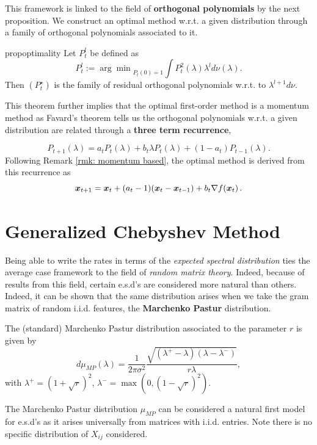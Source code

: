 \documentclass{article}
\begin{document}
This framework is  linked to the field of \textbf{orthogonal polynomials} by the next proposition. We construct an optimal method w.r.t. a given distribution through a family  of orthogonal polynomials associated to it.


\begin{restatable}{prop}{optimality}\citep{pedregosa2020acceleration}
 \label{prop: optimality}
 Let $P_t^l$ be defined as
 \begin{equation}
     P_t^l:={\arg \min}_{P_t(0)=1} \int P_t^2(\lambda) \lambda^l d\nu(\lambda).
 \end{equation}
 Then $(P_t^\star)$ is the family of residual orthogonal polynomials w.r.t. to $\lambda^{l+1}d\nu$.
\end{restatable}

This theorem further implies that the optimal first-order method is a momentum method as Favard's theorem \cite{marcellan2001favard} tells us the orthogonal polynomials w.r.t. a given distribution are related through a \textbf{three term recurrence},

\begin{equation}
    P_{t+1}(\lambda)=a_tP_t(\lambda)+b_t\lambda P_t(\lambda)+(1-a_t)P_{t-1}(\lambda).
\end{equation}
Following Remark \ref{rmk: momentum based}, the optimal method is derived from this recurrence as
\begin{equation}
    {\boldsymbol x}_{t+1}={\boldsymbol x}_t+(a_t-1)({\boldsymbol x}_t-{\boldsymbol x}_{t-1})+b_t\nabla f({\boldsymbol x}_t)\,.
\end{equation}



\section{Generalized Chebyshev Method} \label{section: methods}
Being able to write the rates in terms of the \textit{expected spectral distribution} ties the average case framework to the field of \textit{random matrix theory}. Indeed, because of results from this field, certain e.s.d's are considered more natural than others. Indeed, it can be shown that the same distribution arises when we take the gram matrix of random i.i.d. features, the \textbf{Marchenko Pastur} distribution. 

\begin{definition}
The (standard) Marchenko Pastur distribution associated to the parameter  $r$ is given by 
\begin{equation}
d\mu_{MP}(\lambda)=\frac{1}{2\pi\sigma^2}\frac{\sqrt{(\lambda^+-\lambda)(\lambda-\lambda^-)}}{r\lambda} ,
\end{equation}
with $\lambda^+=(1+\sqrt{r})^2$, $\lambda^-=\max(0,(1-\sqrt{r})^2)$.
\end{definition}
The Marchenko Pastur distribution $\mu_{MP}$ can be considered a natural first model for e.s.d's as it arises universally from matrices with i.i.d. entries. Note there is no specific distribution of $X_{ij}$ considered. 
\end{document}
